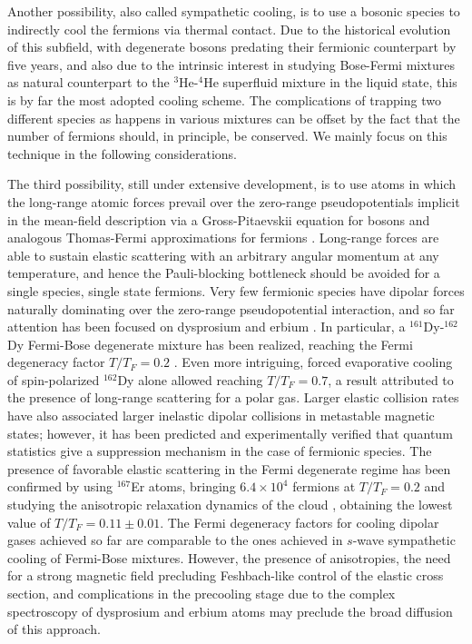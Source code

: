 \documentclass[pra,letterpaper,twocolumn,showpacs,superscriptaddress]{revtex4}
\begin{document}
Another possibility, also called sympathetic cooling, is to use a bosonic species to indirectly cool the fermions via thermal contact. 
Due to the historical evolution of this subfield, with degenerate bosons predating their fermionic counterpart by five years, and also 
due to the intrinsic interest in studying Bose-Fermi mixtures as natural counterpart to the ${}^3$He-${}^4$He superfluid mixture in the 
liquid state, this is by far the most adopted cooling scheme. The complications of trapping two  different species as happens in various 
mixtures can be offset by the fact that the number of fermions should, in principle, be conserved. 
We mainly focus on this technique in the following considerations.

The third possibility, still under extensive development, is to use atoms in which the long-range atomic forces prevail
over the zero-range pseudopotentials implicit in the mean-field description via a Gross-Pitaevskii equation for bosons and 
analogous Thomas-Fermi approximations for fermions \cite{Baranov2008,Martin2016}. Long-range forces are able to sustain elastic 
scattering with an arbitrary angular momentum at any temperature, and hence the Pauli-blocking bottleneck should be avoided for a single species, 
single state fermions. Very few fermionic species have dipolar forces naturally dominating over the zero-range pseudopotential 
interaction, and so far attention has been focused on dysprosium  \cite{Lu2012,Burdick2015,Burdick2016} and erbium 
\cite{Aikawa2014a,Aikawa2014b}.  In particular, a ${}^{161}$Dy-${}^{162}$Dy Fermi-Bose degenerate mixture has been 
realized, reaching the Fermi degeneracy factor $T/T_F=0.2$ \cite{Lu2012}. Even more intriguing, forced evaporative cooling of spin-polarized 
${}^{162}$Dy alone allowed reaching $T/T_F=0.7$, a result attributed to the presence of long-range scattering for a polar gas.
Larger elastic collision rates have also associated larger inelastic dipolar collisions in metastable magnetic states; however, it has been 
predicted \cite{Pasquiou2010} and experimentally verified \cite{Burdick2015} that quantum statistics give a suppression mechanism in the case 
of fermionic species. The presence of favorable elastic scattering in the Fermi degenerate regime has been confirmed by using ${}^{167}$Er atoms, 
bringing $6.4 \times 10^4$ fermions at $T/T_F=0.2$ \cite{Aikawa2014a} and studying the anisotropic relaxation dynamics of the cloud \cite{Aikawa2014b}, 
obtaining the lowest value of $T/T_F=0.11\pm 0.01$. The Fermi degeneracy factors for cooling dipolar gases achieved so far are comparable 
to the ones achieved in $s$-wave sympathetic cooling of Fermi-Bose mixtures. However, the presence of anisotropies, the need for a strong magnetic field precluding 
Feshbach-like control of the elastic cross section, and complications in the precooling stage due to the complex spectroscopy of dysprosium and erbium atoms 
may preclude the broad diffusion of this approach. 
\end{document}
